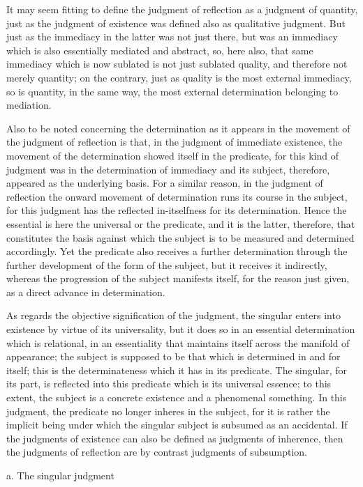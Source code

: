 It may seem fitting to define the
judgment of reflection as a judgment of quantity,
just as the judgment of existence was defined
also as qualitative judgment.
But just as the immediacy in the latter was not just there,
but was an immediacy which is also essentially mediated and abstract,
so, here also, that same immediacy which is now sublated
is not just sublated quality,
and therefore not merely quantity;
on the contrary, just as quality is
the most external immediacy,
so is quantity, in the same way,
the most external determination
belonging to mediation.

Also to be noted concerning the determination as it appears
in the movement of the judgment of reflection is
that, in the judgment of immediate existence,
the movement of the determination showed itself in the predicate,
for this kind of judgment was in  the determination
of immediacy and its subject,
therefore, appeared as the underlying basis.
For a similar reason, in the judgment of reflection
the onward movement of determination runs
its course in the subject,
for this judgment has the reflected in-itselfness
for its determination.
Hence the essential is here the universal or the predicate,
and it is the latter, therefore,
that constitutes the basis against which
the subject is to be measured and determined accordingly.
Yet the predicate also receives a further determination
through the further development of the form of the subject,
but it receives it indirectly,
whereas the progression of the subject manifests itself,
for the reason just given,
as a direct advance in determination.

As regards the objective signification of the judgment,
the singular enters into existence by virtue of its universality,
but it does so in an essential determination which is relational,
in an essentiality that maintains itself across the manifold of appearance;
the subject is supposed to be that which is determined in and for itself;
this is the determinateness which it has in its predicate.
The singular, for its part, is reflected into this predicate
which is its universal essence;
to this extent, the subject is a concrete existence
and a phenomenal something.
In this judgment, the predicate no longer inheres in the subject,
for it is rather the implicit being under which the singular
subject is subsumed as an accidental.
If the judgments of existence can also
be defined as judgments of inherence,
then the judgments of reflection are
by contrast judgments of subsumption.

a. The singular judgment

